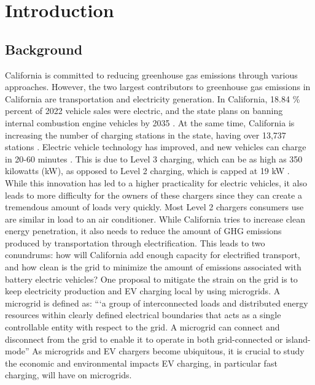 \documentclass[conference]{IEEEtran}
\begin{document}
\section{Introduction}
    \subsection{Background}
	California is committed to reducing greenhouse gas emissions through various approaches. However, the two largest contributors to greenhouse gas emissions in California are transportation and electricity generation. In California, 18.84 \% percent of 2022 vehicle sales were electric, \cite{ev_sale_percentage} and the state plans on banning internal combustion engine vehicles by 2035 \cite{ice_ban}. At the same time, California is increasing the number of charging stations in the state, having over 13,737 stations \cite{ev_stations_CA}. Electric vehicle technology has improved, and new vehicles can charge in 20-60 minutes \cite{ev_stats}. This is due to Level 3 charging, which can be as high as 350 kilowatts (kW), as opposed to Level 2 charging, which is capped at 19 kW \cite{ev_stats}. While this innovation has led to a higher practicality for electric vehicles, it also leads to more difficulty for the owners of these chargers since they can create a tremendous amount of loads very quickly. Most Level 2 chargers consumers use are similar in load to an air conditioner. While California tries to increase clean energy penetration, it also needs to reduce the amount of GHG emissions produced by transportation through electrification. This leads to two conundrums: how will California add enough capacity for electrified transport, and how clean is the grid to minimize the amount of emissions associated with battery electric vehicles? One proposal to mitigate the strain on the grid is to keep electricity production and EV charging local by using microgrids. A microgrid is defined as: “‘a group of interconnected loads and distributed energy resources within clearly defined electrical boundaries that acts as a single controllable entity with respect to the grid. A microgrid can connect and disconnect from the grid to enable it to operate in both grid-connected or island-mode” As microgrids and EV chargers become ubiquitous, it is crucial to study the economic and environmental impacts EV charging, in particular fast charging, will have on microgrids.
\end{document}
